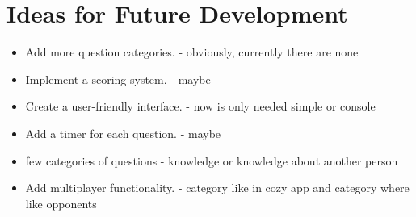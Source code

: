 \documentclass[a4paper,12pt]{article}
\begin{document}
\section{Ideas for Future Development}
\begin{itemize}
    \item Add more question categories. - obviously, currently there are none
    \item Implement a scoring system. - maybe
    \item Create a user-friendly interface. - now is only needed simple or console
    \item Add a timer for each question. - maybe
    \item few categories of questions - knowledge or knowledge about another person
    \item Add multiplayer functionality. - category like in cozy app and category where like opponents
\end{itemize}


\end{document}

